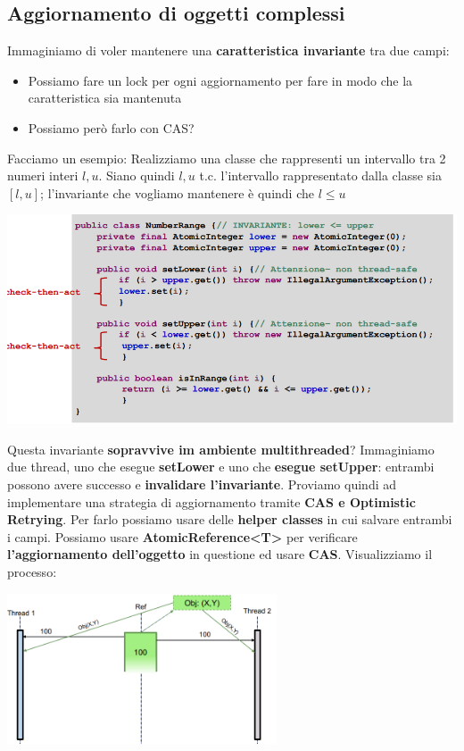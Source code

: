 \documentclass[12pt]{article}
\begin{document}
\subsection{Aggiornamento di oggetti complessi}
Immaginiamo di voler mantenere una \textbf{caratteristica invariante} tra due campi:
\begin{itemize}
    \item Possiamo fare un lock per ogni aggiornamento per fare in modo che la caratteristica sia mantenuta
    \item Possiamo però farlo con CAS?
\end{itemize}
Facciamo un esempio: Realizziamo una classe che rappresenti un intervallo tra 2 numeri interi $l, u$. Siano quindi $l, u$ t.c. l'intervallo rappresentato dalla classe sia $[l,u]$; l'invariante che vogliamo mantenere è quindi che $l \leq u$
\begin{center}
    \includegraphics[width = 1\textwidth]{Images/94.png}
\end{center}
Questa invariante \textbf{sopravvive im ambiente multithreaded}? Immaginiamo due thread, uno che esegue \textbf{setLower} e uno che \textbf{esegue setUpper}: entrambi possono avere successo e \textbf{invalidare l'invariante}. Proviamo quindi ad implementare una strategia di aggiornamento tramite \textbf{CAS e Optimistic Retrying}. Per farlo possiamo usare delle \textbf{helper classes} in cui salvare entrambi i campi. Possiamo usare \newline \textbf{AtomicReference<T>} per verificare \textbf{l'aggiornamento dell'oggetto} in questione ed usare \textbf{CAS}. Visualizziamo il processo:
\begin{center}
    \includegraphics[width = 0.60\textwidth]{Images/95.png}
\end{center}
\end{document}
